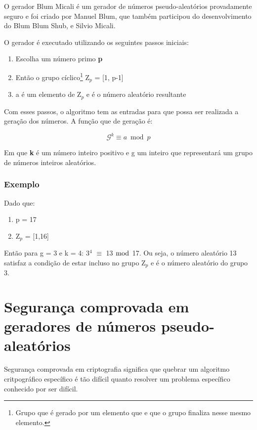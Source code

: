 O gerador Blum Micali é um gerador de números pseudo-aleatórios provadamente seguro e foi criado por Manuel Blum, que também participou do desenvolvimento do Blum Blum Shub, e Silvio Micali. ~\cite{josefin-martin}

O gerador é executado utilizando os seguintes passos iniciais:

\begin{enumerate}
	\item Escolha um número primo \textbf{p}
	\item Então o grupo cíclico\footnote{Grupo que é gerado por um elemento que e que o grupo finaliza nesse mesmo elemento.} Z$_p$ = [1, p-1]
	\item a é um elemento de Z$_p$ e é o número aleatório resultante
\end{enumerate}


Com esses passos, o algoritmo tem as entradas para que possa ser realizada a geração dos números. A função que de geração é:

\begin{equation}
	\mathcal{G}^k \equiv a \bmod p
\end{equation}

Em que \textbf{k} é um número inteiro positivo e g um inteiro que representará um grupo de números inteiros aleatórios.

\subsubsection{Exemplo}

Dado que:

\begin{enumerate}
	\item p = 17
	\item Z$_p$ = [1,16]
\end{enumerate}

Então para g = 3 e k = 4: 3$^4$ $\equiv$ 13 $\bmod$ 17. Ou seja, o número aleatório 13 satisfaz a condição de estar incluso no grupo Z$_p$ e é o número aleatório do grupo 3.

\section{Segurança comprovada em geradores de números pseudo-aleatórios}
\label{security-of-prng}

Segurança comprovada em criptografia significa que quebrar um algoritmo critpográfico específico é tão difícil quanto resolver um problema específico conhecido por ser difícil. ~\cite{josefin-martin}

